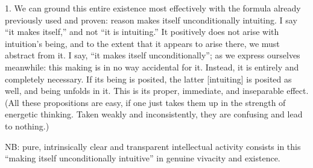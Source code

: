 1. We can ground this entire existence
most effectively with the formula
already previously used and proven:
reason makes itself unconditionally intuiting.
I say “it makes itself,” and not “it is intuiting.”
It positively does not arise with intuition's being,
and to the extent that it appears to arise there,
we must abstract from it.
I say, “it makes itself unconditionally”;
as we express ourselves meanwhile:
this making is in no way accidental for it.
Instead, it is entirely and completely necessary.
If its being is posited, the latter [intuiting]
is posited as well, and being unfolds in it.
This is its proper, immediate, and inseparable effect.
(All these propositions are easy,
if one just takes them up
in the strength of energetic thinking.
Taken weakly and inconsistently,
they are confusing and lead to nothing.)

NB: pure, intrinsically clear and transparent
intellectual activity consists in this
“making itself unconditionally intuitive”
in genuine vivacity and existence.

